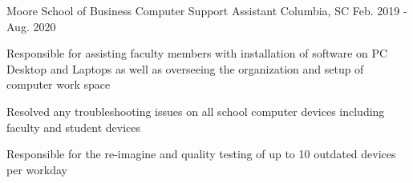 
\begin{cventries}
    
  \cventry
    {Moore School of Business} %
    {Computer Support Assistant} %
    {Columbia, SC} %
    {Feb. 2019 - Aug. 2020} %
    {
      \begin{cvitems} %
        \item {Responsible for assisting faculty members with installation of software on PC Desktop and Laptops as well as overseeing the organization and setup of computer work space}
        \item {Resolved any troubleshooting issues on all school computer devices including faculty and student devices}
        \item {Responsible for the re-imagine and quality testing of up to 10 outdated devices per workday}
      \end{cvitems}
    }


\end{cventries}
